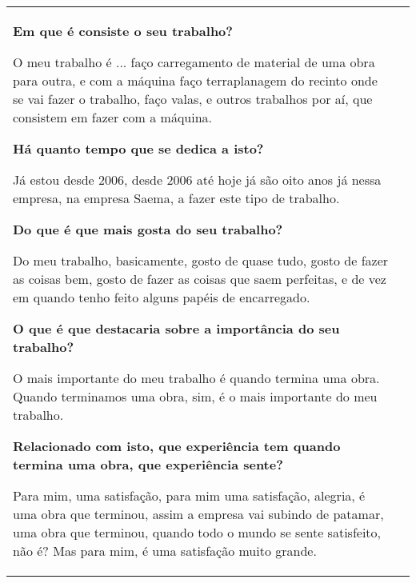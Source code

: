 \begin{tabular}{ll}
  \begin{minipage}{0.6\linewidth}
    {\bf\Large Em que é consiste o seu trabalho?}


\vspace{10pt}

O meu trabalho é ... faço carregamento de material de uma obra para outra, e com a
máquina faço terraplanagem do recinto onde se vai fazer o trabalho, faço valas, e outros
trabalhos por aí, que consistem em fazer com a máquina.

\vspace{20pt}

{\bf\Large Há quanto tempo que se dedica a isto?}

\vspace{10pt}

Já estou desde 2006, desde 2006 até hoje já são oito anos já nessa empresa, na empresa Saema, a fazer este tipo de trabalho.

\vspace{20pt}

{\bf\Large Do que é que mais gosta do seu trabalho?}

\vspace{10pt}

Do meu trabalho, basicamente, gosto de quase tudo, gosto de fazer as coisas bem, gosto de fazer as coisas que saem perfeitas, e de vez em quando tenho feito alguns papéis de encarregado.

\vspace{20pt}

{\bf\Large O que é que destacaria sobre a importância do seu trabalho?}

\vspace{10pt}

O mais importante do meu trabalho é quando termina uma obra. Quando terminamos uma obra, sim, é o mais importante do meu trabalho. 

\vspace{20pt}

{\bf\Large Relacionado com isto, que experiência tem quando termina uma obra, que experiência sente?}

\vspace{10pt}

Para mim, uma satisfação, para mim uma satisfação, alegria, é uma obra que terminou, assim a empresa vai subindo de patamar, uma obra que terminou, quando todo o mundo se sente satisfeito, não é? Mas para mim, é uma satisfação muito grande. 


\end{minipage}
\end{tabular}
